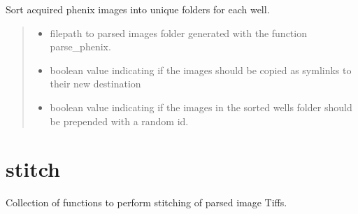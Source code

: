 \documentclass[a4paper,10pt,english,openany,oneside]{sphinxmanual}
\begin{document}
\begin{fulllineitems}
\label{\detokenize{pages/modules:vipertools.parse.sort_wells}}
\pysigstartsignatures
{}
\pysigstopsignatures
\sphinxAtStartPar
Sort acquired phenix images into unique folders for each well.
\begin{quote}\begin{description}
\begin{itemize}
\item {} 
\sphinxAtStartPar
{} \textendash{} filepath to parsed images folder generated with the function parse\_phenix.

\item {} 
\sphinxAtStartPar
{} \textendash{} boolean value indicating if the images should be copied as symlinks to their new destination

\item {} 
\sphinxAtStartPar
{} \textendash{} boolean value indicating if the images in the sorted wells folder should be prepended with a random id.

\end{itemize}

\end{description}\end{quote}

\end{fulllineitems}

\label{\detokenize{pages/modules:module-vipertools.stitch}}

\section{stitch}
\label{\detokenize{pages/modules:stitch}}
\sphinxAtStartPar
Collection of functions to perform stitching of parsed image Tiffs.
\end{document}
